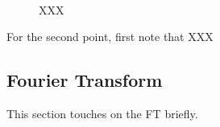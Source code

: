 \documentclass{article}
\begin{document}
		\begin{figure}[t!]
			\centering
			\hspace*{2.0em}
			 \\
			\caption{XXX}
			\label{fig:lo_freq_resol}
		\end{figure}
	
		For the second point, first note that XXX
		
	\subsection{Fourier Transform}
	
	This section touches on the FT briefly. 

		
		
		
		
		
	
	
	
\end{document}
